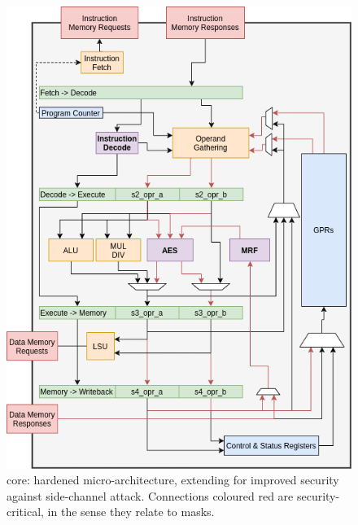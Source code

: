 \begin{figure}[!h]
\centering
\includegraphics[scale=0.45,angle=90]{diagrams/scarv-cpu-uarch-sca.png}
\caption{
   core: hardened micro-architecture, 
  extending  for improved security against side-channel attack.
  Connections coloured red are security-critical, in the sense they relate to masks.
}
\label{fig:core:2:secure}
\end{figure}

\vspace*{\fill}

